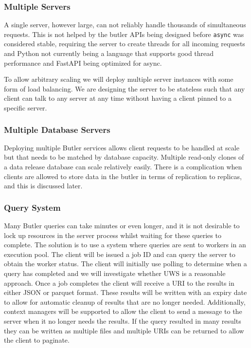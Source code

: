 \subsubsection{Multiple Servers}\label{multiple-servers}

A single server, however large, can not reliably handle thousands of simultaneous requests.
This is not helped by the butler APIs being designed before \texttt{async} was considered stable, requiring the server to create threads for all incoming requests and Python not currently being a language that supports good thread performance and FastAPI being optimized for async.

To allow arbitrary scaling we will deploy multiple server instances with some form of load balancing.
We are designing the server to be stateless such that any client can talk to any server at any time without having a client pinned to a specific server.

\subsubsection{Multiple Database Servers}\label{multiple-database-servers}

Deploying multiple Butler services allows client requests to be handled at scale but that needs to be matched by database capacity.
Multiple read-only clones of a data release database can scale relatively easily.
There is a complication when clients are allowed to store data in the butler in terms of replication to replicas, and this is discussed later.

\subsubsection{Query System}\label{query-system}

Many Butler queries can take minutes or even longer, and it is not desirable to lock up resources in the server process whilst waiting for these queries to complete.
The solution is to use a system where queries are sent to workers in an execution pool.
The client will be issued a job ID and can query the server to obtain the worker status.
The client will initially use polling to determine when a query has completed and we will investigate whether UWS \cite{2016ivoa.spec.1024H} is a reasonable approach.
Once a job completes the client will receive a URI to the results in either JSON or parquet format.
These results will be written with an expiry date to allow for automatic cleanup of results that are no longer
needed.
Additionally, context managers will be supported to allow the client to send a message to the server when it no longer needs the results.
If the query resulted in many results they can be written as multiple files and multiple URIs can be returned to allow the client to paginate.

